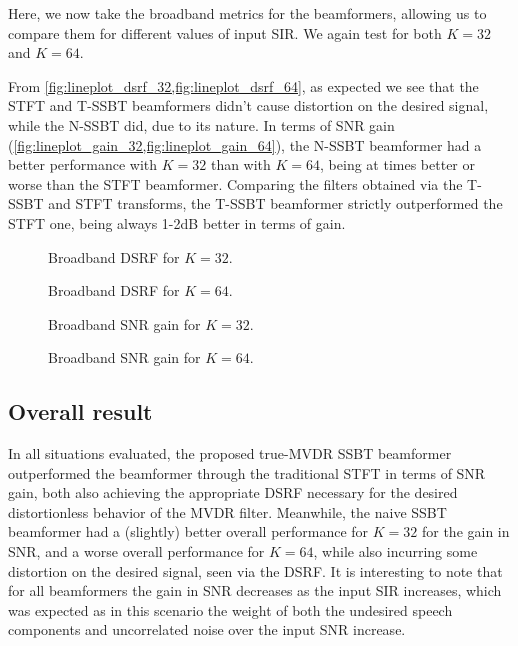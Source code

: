 Here, we now take the broadband metrics for the beamformers, allowing us to compare them for different values of input SIR. We again test for both $K = 32$ and $K = 64$.

From \cref{fig:lineplot_dsrf_32,fig:lineplot_dsrf_64}, as expected we see that the STFT and T-SSBT beamformers didn't cause distortion on the desired signal, while the N-SSBT did, due to its nature. In terms of SNR gain (\cref{fig:lineplot_gain_32,fig:lineplot_gain_64}), the N-SSBT beamformer had a better performance with $K = 32$ than with $K = 64$, being at times better or worse than the STFT beamformer. Comparing the filters obtained via the T-SSBT and STFT transforms, the T-SSBT beamformer strictly outperformed the STFT one, being always 1-2dB better in terms of gain.

\begin{figure}[H]
	\centering
	
	\caption{Broadband DSRF for $K = 32$.}
	\label{fig:lineplot_dsrf_32}
\end{figure}

\begin{figure}[H]
	\centering
	
	\caption{Broadband DSRF for $K = 64$.}
	\label{fig:lineplot_dsrf_64}
\end{figure}

\begin{figure}[H]
	\centering
	
	\caption{Broadband SNR gain for $K = 32$.}
	\label{fig:lineplot_gain_32}
\end{figure}

\begin{figure}[H]
\centering

\caption{Broadband SNR gain for $K = 64$.}
\label{fig:lineplot_gain_64}
\end{figure}

\subsection{Overall result}

In all situations evaluated, the proposed true-MVDR SSBT beamformer outperformed the beamformer through the traditional STFT in terms of SNR gain, both also achieving the appropriate DSRF necessary for the desired distortionless behavior of the MVDR filter. Meanwhile, the naive SSBT beamformer had a (slightly) better overall performance for $K = 32$ for the gain in SNR, and a worse overall performance for $K = 64$, while also incurring some distortion on the desired signal, seen via the DSRF. It is interesting to note that for all beamformers the gain in SNR decreases as the input SIR increases, which was expected as in this scenario the weight of both the undesired speech components and uncorrelated noise over the input SNR increase.